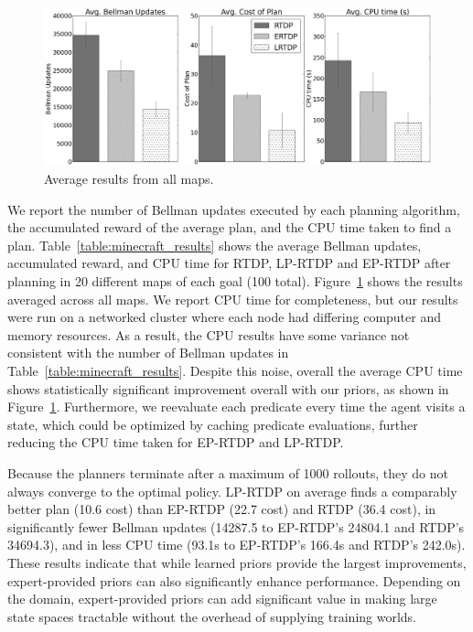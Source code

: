 \documentclass[letterpaper]{article}
\begin{document}
\begin{figure}[t]
\centering
\includegraphics[width=1\linewidth]{figures/average_results_cropped.png}%
\caption{Average results from all maps.}
\label{fig:average_results}
\end{figure}

We report the number of Bellman updates executed by each planning
algorithm, the accumulated reward of the average plan, and the CPU
time taken to find a plan. Table~\ref{table:minecraft_results} shows
the average Bellman updates, accumulated reward, and CPU time for
RTDP, LP-RTDP and EP-RTDP after planning in 20 different maps of each
goal (100 total). Figure~\ref{fig:average_results} shows the
results averaged across all maps.  We report CPU time for
completeness, but our results were run on a networked cluster where
each node had differing computer and memory resources. As a result,
the CPU results have some variance not consistent with the number of
Bellman updates in Table~\ref{table:minecraft_results}.  Despite this
noise, overall the average CPU time shows statistically significant
improvement overall with our priors, as shown in
Figure~\ref{fig:average_results}. Furthermore, we reevaluate each
predicate every time the agent visits a state, which could be optimized by caching predicate evaluations, further
reducing the CPU time taken for EP-RTDP and LP-RTDP.

Because the planners terminate after a maximum of 1000
rollouts, they do not always converge to the optimal policy. LP-RTDP on
average finds a comparably better plan (10.6 cost) than EP-RTDP (22.7
cost) and RTDP (36.4 cost), in significantly fewer
Bellman updates (14287.5 to EP-RTDP's 24804.1 and RTDP's 34694.3), and in
less CPU time (93.1s to EP-RTDP's 166.4s and RTDP's 242.0s).  These
results indicate that while learned priors provide the largest
improvements, expert-provided priors can also significantly
enhance performance. Depending on the domain, expert-provided priors can add
significant value in making large state spaces tractable without the
overhead of supplying training worlds.
\end{document}
